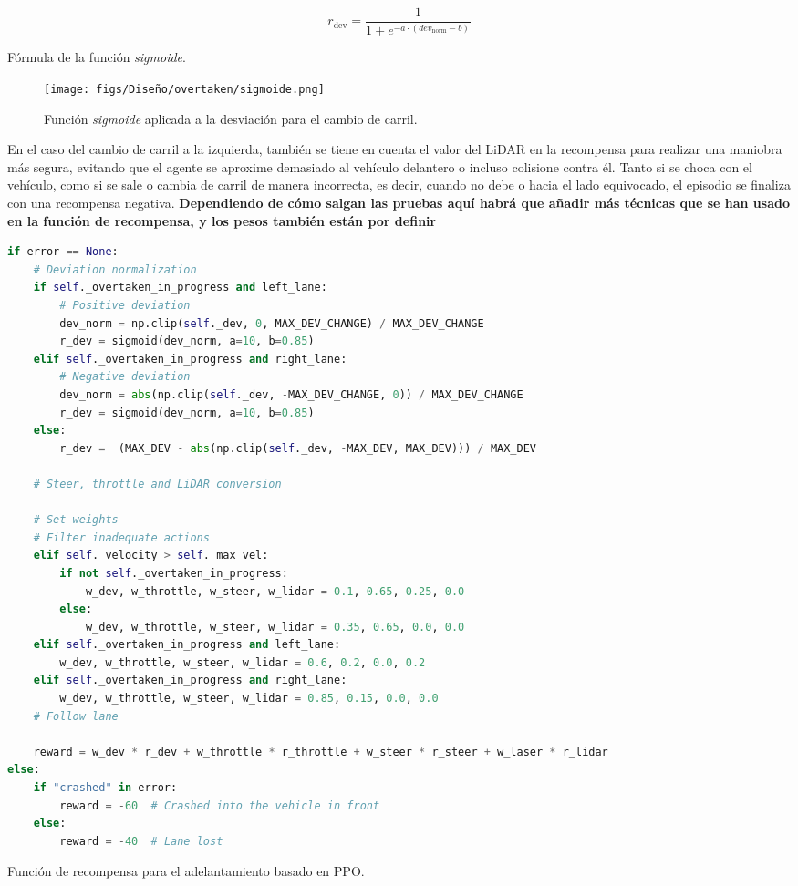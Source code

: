   \begin{myequation}[H]
    \begin{equation} 
       r_{\text{dev}} = \frac{1}{1 + e^{-a \cdot (dev_{\text{norm}} - b)}}
    \end{equation} 
    \caption{Fórmula de la función \textit{sigmoide}.}
\label{eq:sigmoid_deviation}
  \end{myequation}

\begin{figure}[ht]
\centering
\texttt{[image: figs/Diseño/overtaken/sigmoide.png]}
\caption{Función \textit{sigmoide} aplicada a la desviación para el cambio de carril.}
\label{fig:sigmoide}
\end{figure}

En el caso del cambio de carril a la izquierda, también se tiene en cuenta el valor del \ac{LiDAR} en la recompensa para realizar una maniobra más segura, evitando que el agente se aproxime demasiado al vehículo delantero o incluso colisione contra él. Tanto si se choca con el vehículo, como si se sale o cambia de carril de manera incorrecta, es decir, cuando no debe o hacia el lado equivocado, el episodio se finaliza con una recompensa negativa. \textbf{Dependiendo de cómo salgan las pruebas aquí habrá que añadir más técnicas que se han usado en la función de recompensa, y los pesos también están por definir}

\begin{code}[H]
\begin{lstlisting}[language=Python]
if error == None:
    # Deviation normalization
    if self._overtaken_in_progress and left_lane:
        # Positive deviation
        dev_norm = np.clip(self._dev, 0, MAX_DEV_CHANGE) / MAX_DEV_CHANGE
        r_dev = sigmoid(dev_norm, a=10, b=0.85)
    elif self._overtaken_in_progress and right_lane:
        # Negative deviation 
        dev_norm = abs(np.clip(self._dev, -MAX_DEV_CHANGE, 0)) / MAX_DEV_CHANGE
        r_dev = sigmoid(dev_norm, a=10, b=0.85)
    else:
        r_dev =  (MAX_DEV - abs(np.clip(self._dev, -MAX_DEV, MAX_DEV))) / MAX_DEV

    # Steer, throttle and LiDAR conversion

    # Set weights
    # Filter inadequate actions
    elif self._velocity > self._max_vel:
        if not self._overtaken_in_progress:
            w_dev, w_throttle, w_steer, w_lidar = 0.1, 0.65, 0.25, 0.0
        else:
            w_dev, w_throttle, w_steer, w_lidar = 0.35, 0.65, 0.0, 0.0
    elif self._overtaken_in_progress and left_lane:
        w_dev, w_throttle, w_steer, w_lidar = 0.6, 0.2, 0.0, 0.2
    elif self._overtaken_in_progress and right_lane:
        w_dev, w_throttle, w_steer, w_lidar = 0.85, 0.15, 0.0, 0.0  
    # Follow lane

    reward = w_dev * r_dev + w_throttle * r_throttle + w_steer * r_steer + w_laser * r_lidar
else:
    if "crashed" in error:
        reward = -60  # Crashed into the vehicle in front
    else:
        reward = -40  # Lane lost
\end{lstlisting}
\caption[Función de recompensa para el adelantamiento basado en \ac{PPO}]{Función de recompensa para el adelantamiento basado en \ac{PPO}.}
\label{cod:rew_ppo_overtaken}
\end{code}

